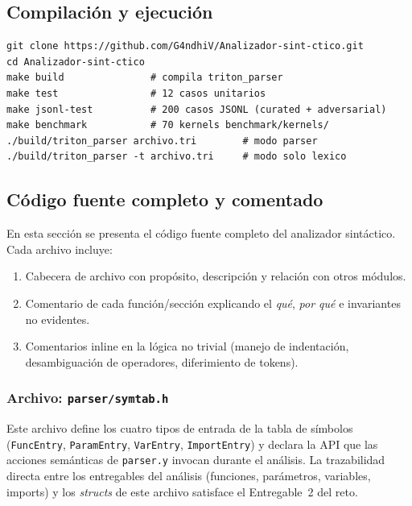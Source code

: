 \subsection{Compilación y ejecución}

\begin{verbatim}
git clone https://github.com/G4ndhiV/Analizador-sint-ctico.git
cd Analizador-sint-ctico
make build               # compila triton_parser
make test                # 12 casos unitarios
make jsonl-test          # 200 casos JSONL (curated + adversarial)
make benchmark           # 70 kernels benchmark/kernels/
./build/triton_parser archivo.tri        # modo parser
./build/triton_parser -t archivo.tri     # modo solo lexico
\end{verbatim}

\subsection{Código fuente completo y comentado}

En esta sección se presenta el código fuente completo del analizador sintáctico.
Cada archivo incluye:
\begin{enumerate}
  \item Cabecera de archivo con propósito, descripción y relación con otros módulos.
  \item Comentario de cada función/sección explicando el \textit{qué}, \textit{por qué} e invariantes no evidentes.
  \item Comentarios inline en la lógica no trivial (manejo de indentación, desambiguación de operadores, diferimiento de tokens).
\end{enumerate}

\subsubsection{Archivo: \texttt{parser/symtab.h}}

Este archivo define los cuatro tipos de entrada de la tabla de símbolos
(\texttt{FuncEntry}, \texttt{ParamEntry}, \texttt{VarEntry}, \texttt{ImportEntry})
y declara la API que las acciones semánticas de \texttt{parser.y} invocan
durante el análisis. La trazabilidad directa entre los entregables del análisis
(funciones, parámetros, variables, imports) y los \textit{structs} de este archivo
satisface el Entregable~2 del reto.

